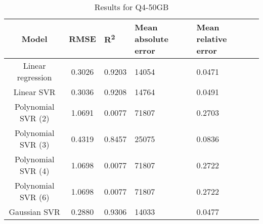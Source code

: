 \begin{table}[H]
\centering
\begin{adjustbox}{center}
\begin{tabular}{c | c M{1.2cm} M{2.5cm} M{2.5cm} M{1.8cm}}
Model & RMSE & R\textsuperscript{2} & Mean absolute error & Mean relative error \tabularnewline
\hline
Linear regression & 0.3026 & 0.9203 &  14054 & 0.0471 \\
Linear SVR & 0.3036 & 0.9208 &  14764 & 0.0491 \\
Polynomial SVR (2) & 1.0691 & 0.0077 &  71807 & 0.2703 \\
Polynomial SVR (3) & 0.4319 & 0.8457 &  25075 & 0.0836 \\
Polynomial SVR (4) & 1.0698 & 0.0077 &  71807 & 0.2722 \\
Polynomial SVR (6) & 1.0698 & 0.0077 &  71807 & 0.2722 \\
Gaussian SVR & 0.2880 & 0.9306 &  14033 & 0.0477 \\
\end{tabular}
\end{adjustbox}
\\
\caption{Results for Q4-50GB}
\label{tab:all_linear_Q4_50}
\end{table}
